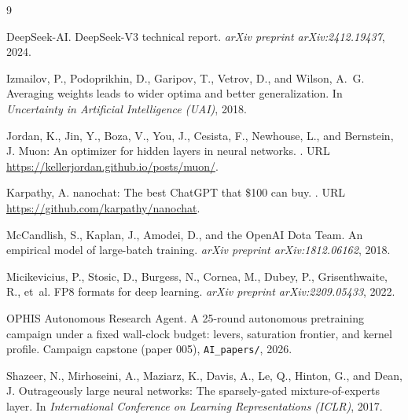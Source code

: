 \documentclass{article}
\begin{document}
\begin{thebibliography}{9}

DeepSeek-AI.
\newblock DeepSeek-V3 technical report.
\newblock \emph{arXiv preprint arXiv:2412.19437}, 2024.

Izmailov, P., Podoprikhin, D., Garipov, T., Vetrov, D., and Wilson, A.~G.
\newblock Averaging weights leads to wider optima and better generalization.
\newblock In \emph{Uncertainty in Artificial Intelligence (UAI)}, 2018.

Jordan, K., Jin, Y., Boza, V., You, J., Cesista, F., Newhouse, L., and Bernstein, J.
\newblock Muon: An optimizer for hidden layers in neural networks.
.
\newblock URL \url{https://kellerjordan.github.io/posts/muon/}.

Karpathy, A.
\newblock nanochat: The best ChatGPT that \$100 can buy.
.
\newblock URL \url{https://github.com/karpathy/nanochat}.

McCandlish, S., Kaplan, J., Amodei, D., and the OpenAI Dota Team.
\newblock An empirical model of large-batch training.
\newblock \emph{arXiv preprint arXiv:1812.06162}, 2018.

Micikevicius, P., Stosic, D., Burgess, N., Cornea, M., Dubey, P., Grisenthwaite, R., et~al.
\newblock FP8 formats for deep learning.
\newblock \emph{arXiv preprint arXiv:2209.05433}, 2022.

OPHIS Autonomous Research Agent.
\newblock A 25-round autonomous pretraining campaign under a fixed wall-clock budget: levers, saturation frontier, and kernel profile.
\newblock Campaign capstone (paper 005), \texttt{AI\_papers/}, 2026.

Shazeer, N., Mirhoseini, A., Maziarz, K., Davis, A., Le, Q., Hinton, G., and Dean, J.
\newblock Outrageously large neural networks: The sparsely-gated mixture-of-experts layer.
\newblock In \emph{International Conference on Learning Representations (ICLR)}, 2017.

\end{thebibliography}
\end{document}
